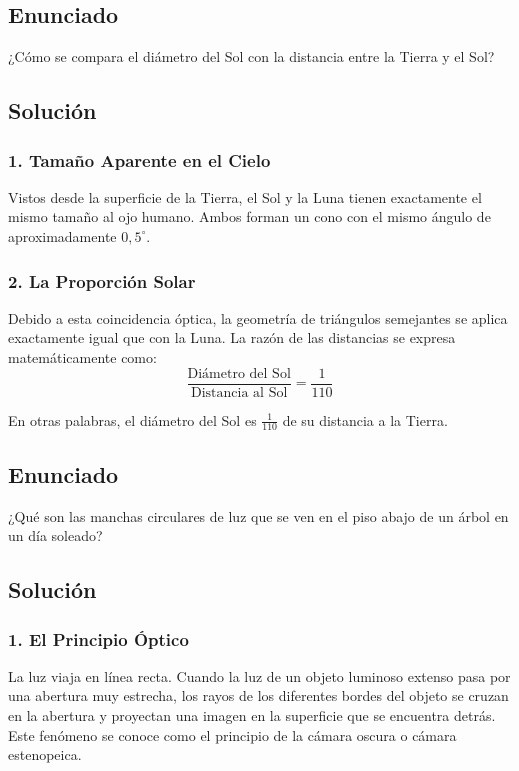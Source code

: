 \documentclass[12pt, a4paper]{article}
\begin{document}
\newpage

\subsection*{Enunciado}
¿Cómo se compara el diámetro del Sol con la distancia entre la Tierra y el Sol?

\subsection*{Solución}

\subsubsection*{1. Tamaño Aparente en el Cielo}
Vistos desde la superficie de la Tierra, el Sol y la Luna tienen exactamente el mismo tamaño al ojo humano. Ambos forman un cono con el mismo ángulo de aproximadamente $0,5^\circ$. 

\subsubsection*{2. La Proporción Solar}
Debido a esta coincidencia óptica, la geometría de triángulos semejantes se aplica exactamente igual que con la Luna. La razón de las distancias se expresa matemáticamente como:
$$ \frac{\text{Diámetro del Sol}}{\text{Distancia al Sol}} = \frac{1}{110} $$

En otras palabras, el diámetro del Sol es $\frac{1}{110}$ de su distancia a la Tierra.

\newpage

\subsection*{Enunciado}
¿Qué son las manchas circulares de luz que se ven en el piso abajo de un árbol en un día soleado?

\subsection*{Solución}

\subsubsection*{1. El Principio Óptico}
La luz viaja en línea recta. Cuando la luz de un objeto luminoso extenso pasa por una abertura muy estrecha, los rayos de los diferentes bordes del objeto se cruzan en la abertura y proyectan una imagen en la superficie que se encuentra detrás. Este fenómeno se conoce como el principio de la cámara oscura o cámara estenopeica.
\end{document}
